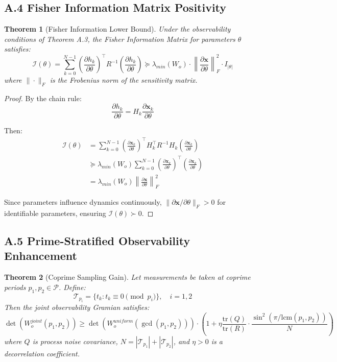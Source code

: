 \documentclass[11pt,letterpaper]{article}
\newtheorem{theorem}{Theorem}[section]
\begin{document}
\subsection*{A.4 Fisher Information Matrix Positivity}

\begin{theorem}[Fisher Information Lower Bound]
Under the observability conditions of Theorem A.3, the Fisher Information Matrix for parameters $\theta$ satisfies:
\[
\mathcal{I}(\theta) = \sum_{k=0}^{N-1} \left( \frac{\partial h_k}{\partial \theta} \right)^\top R^{-1} \left( \frac{\partial h_k}{\partial \theta} \right) \succeq \lambda_{min}(W_o) \cdot \left\| \frac{\partial \mathbf{x}}{\partial \theta} \right\|_F^2 \cdot I_{|\theta|}
\]
where $\|\cdot\|_F$ is the Frobenius norm of the sensitivity matrix.
\end{theorem}

\begin{proof}
By the chain rule:
\[
\frac{\partial h_k}{\partial \theta} = H_k \frac{\partial \mathbf{x}_k}{\partial \theta}
\]

Then:
\begin{align*}
\mathcal{I}(\theta) &= \sum_{k=0}^{N-1} \left( \frac{\partial \mathbf{x}_k}{\partial \theta} \right)^\top H_k^\top R^{-1} H_k \left( \frac{\partial \mathbf{x}_k}{\partial \theta} \right) \\
&\succeq \lambda_{min}(W_o) \sum_{k=0}^{N-1} \left( \frac{\partial \mathbf{x}_k}{\partial \theta} \right)^\top \left( \frac{\partial \mathbf{x}_k}{\partial \theta} \right) \\
&= \lambda_{min}(W_o) \left\| \frac{\partial \mathbf{x}}{\partial \theta} \right\|_F^2
\end{align*}

Since parameters influence dynamics continuously, $\|\partial \mathbf{x}/\partial \theta\|_F > 0$ for identifiable parameters, ensuring $\mathcal{I}(\theta) \succ 0$.
\end{proof}

\subsection*{A.5 Prime-Stratified Observability Enhancement}

\begin{theorem}[Coprime Sampling Gain]
Let measurements be taken at coprime periods $p_1, p_2 \in \mathcal{P}$. Define:
\[
\mathcal{T}_{p_i} = \{t_k : t_k \equiv 0 \pmod{p_i}\}, \quad i = 1, 2
\]
Then the joint observability Gramian satisfies:
\[
\det(W_o^{joint}(p_1, p_2)) \geq \det(W_o^{uniform}(\gcd(p_1, p_2))) \cdot \left(1 + \eta \frac{\text{tr}(Q)}{\text{tr}(R)} \cdot \frac{\sin^2(\pi / \text{lcm}(p_1, p_2))}{N}\right)
\]
where $Q$ is process noise covariance, $N = |\mathcal{T}_{p_1}| + |\mathcal{T}_{p_2}|$, and $\eta > 0$ is a decorrelation coefficient.
\end{theorem}
\end{document}
